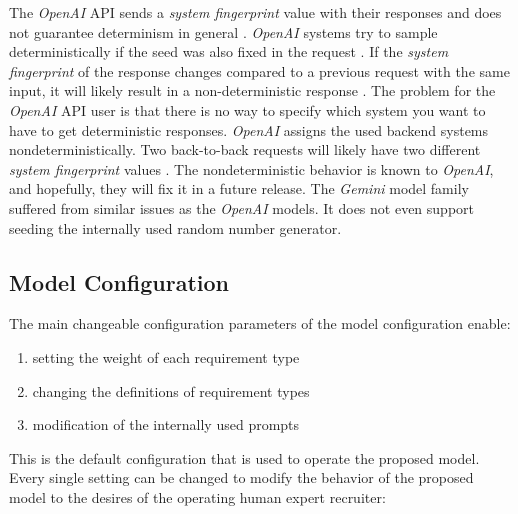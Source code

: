 \documentclass[draft,final]{thesisclass} %
\begin{document}
The \textit{OpenAI} API sends a \textit{system fingerprint} value with their responses and does not guarantee determinism in general \parencite{openai_chat_api}.
\textit{OpenAI} systems try to sample deterministically if the seed was also fixed in the request \parencite{openai_chat_api}.
If the \textit{system fingerprint} of the response changes compared to a previous request with the same input, it will likely result in a non-deterministic response \parencite{openai_chat_api}.
The problem for the \textit{OpenAI} API user is that there is no way to specify which system you want to have to get deterministic responses. \textit{OpenAI} assigns the used backend systems nondeterministically. Two back-to-back requests will likely have two different \textit{system fingerprint} values \parencite{openai_chat_api}.
The nondeterministic behavior is known to \textit{OpenAI}, and hopefully, they will fix it in a future release.
The \textit{Gemini} model family suffered from similar issues as the \textit{OpenAI} models. It does not even support seeding the internally used random number generator.

\subsection{Model Configuration} \label{model_configuration}
The main changeable configuration parameters of the model configuration enable:
\begin{enumerate}
    \item setting the weight of each requirement type
    \item changing the definitions of requirement types
    \item modification of the internally used prompts
\end{enumerate}
This is the default configuration that is used to operate the proposed model.
Every single setting can be changed to modify the behavior of the proposed model to the desires of the operating human expert recruiter:

\end{document}
